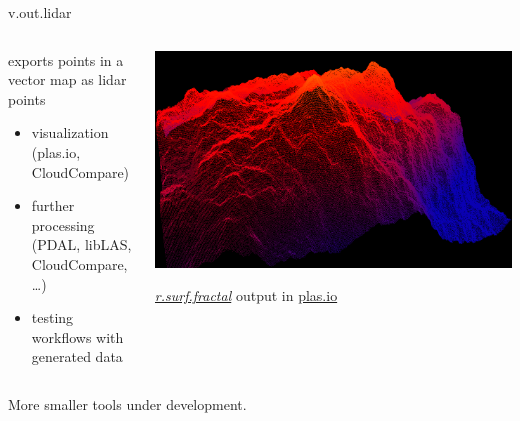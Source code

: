 \documentclass[xcolor={dvipsnames,usenames},beamer,aspectratio=169]{beamer}
\newcommand{\gmodule}[1]{\href{http://grass.osgeo.org/grass71/manuals/#1.html}{\emph{#1}}}
\begin{document}
\begin{frame}{v.out.lidar}

\begin{columns}
\begin{column}{0.28\textwidth}

exports points in a vector map as lidar points

\begin{itemize}
\item visualization (plas.io, CloudCompare)
\item further processing (PDAL, libLAS, CloudCompare, \ldots)
\item testing workflows with generated data
\end{itemize}

\end{column}
\begin{column}{0.7\textwidth}

\begin{center}
\includegraphics[height=0.5\textheight]{images/features/fractals_plasio}

\gmodule{r.surf.fractal} output in \href{http://plas.io}{plas.io}
\end{center}


\end{column}
\end{columns}

\bigskip

More smaller tools under development.

\end{frame}
\end{document}

